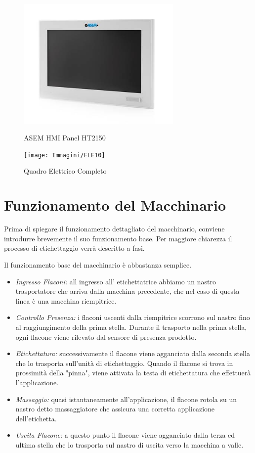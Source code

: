 \documentclass[12pt, a4paper, oneside]{book}
\begin{document}
\begin{itemize}
	\begin{figure}[H]
		\centering
		\includegraphics[width=8cm]{Immagini/ELE9}
		\label{ele9}
		\caption{ASEM HMI Panel HT2150}
	\end{figure}
	
\end{itemize}

	\begin{figure}[H]
	\centering
	\texttt{[image: Immagini/ELE10]}
	\label{ele10}
	\caption{Quadro Elettrico Completo}
	\end{figure}

\section{Funzionamento del Macchinario}
Prima di spiegare il funzionamento dettagliato del macchinario, conviene introdurre brevemente il suo funzionamento base. Per maggiore chiarezza il processo di etichettaggio verrà descritto a fasi.

Il funzionamento base del macchinario è abbastanza semplice. 
\begin{itemize}
	\item \textit{Ingresso Flaconi:} all ingresso all' etichettatrice abbiamo un nastro trasportatore che arriva dalla macchina precedente, che nel caso di questa linea è una macchina riempitrice.
	\item \textit{Controllo Presenza:}  i flaconi uscenti dalla riempitrice scorrono sul nastro fino al raggiungimento della prima stella. Durante il trasporto nella prima stella, ogni flacone viene rilevato dal sensore di presenza prodotto.
	\item \textit{Etichettatura:} successivamente il flacone viene agganciato dalla seconda stella che lo trasporta sull'unità di etichettaggio. Quando il flacone si trova in prossimità della "pinna", viene attivata la testa di etichettatura che effettuerà l'applicazione.
	\item \textit{Massaggio:} quasi istantaneamente all'applicazione, il flacone rotola su un nastro detto massaggiatore che assicura una corretta applicazione dell'etichetta.
	\item \textit{Uscita Flacone:} a questo punto il flacone viene agganciato dalla terza ed ultima stella che lo trasporta sul nastro di uscita verso la macchina a valle. 
\end{itemize}
\end{document}
